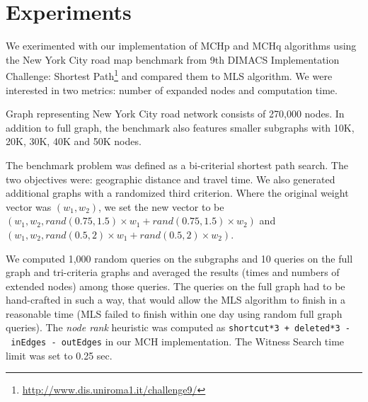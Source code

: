 

\section{Experiments}
\label{secExperiments}

We exerimented with our implementation of MCHp and MCHq algorithms using the New York City road map benchmark from 9th DIMACS Implementation Challenge: Shortest Path\footnote{
\url{http://www.dis.uniroma1.it/challenge9/}} and compared them to MLS algorithm. We were interested in two metrics: number of expanded nodes and computation time.

Graph representing New York City road network consists of 270,000 nodes. In addition to full graph, the benchmark also features smaller subgraphs with 10K, 20K, 30K, 40K and 50K nodes. 

The benchmark problem was defined as a bi-criterial shortest path search. The two objectives were: geographic distance and travel time. 
We also generated additional graphs with a randomized third criterion. Where the original weight vector was $(w_1,w_2)$, we set the new vector to be $(w_1,w_2,rand(0.75,1.5) \times w_1 + rand(0.75,1.5) \times w_2)$ and $(w_1,w_2,rand(0.5,2) \times w_1 + rand(0.5,2) \times w_2)$. 


We computed 1,000 random queries on the subgraphs and 10 queries on the full graph and tri-criteria graphs and averaged the results (times and numbers of extended nodes) among those queries. 
The queries on the full graph had to be hand-crafted in such a way, that would allow the MLS algorithm to finish in a reasonable time (MLS failed to finish within one day using random full graph queries).   
The {\em node rank} heuristic was computed as {\tt shortcut*3 + deleted*3 -~inEdges -~outEdges} in our MCH implementation. The Witness Search time limit was set to 0.25 sec. 

